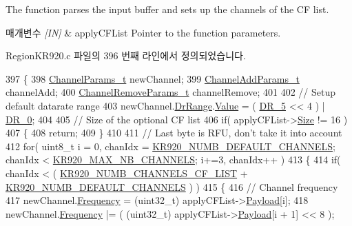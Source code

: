 The function parses the input buffer and sets up the channels of the CF list. 


\begin{DoxyParams}{매개변수}
{\em \mbox{[}\+I\+N\mbox{]}} & apply\+C\+F\+List Pointer to the function parameters. \\
\hline
\end{DoxyParams}


Region\+K\+R920.\+c 파일의 396 번째 라인에서 정의되었습니다.


\begin{DoxyCode}
397 \{
398     \mbox{\hyperlink{structs_channel_params}{ChannelParams\_t}} newChannel;
399     \mbox{\hyperlink{structs_channel_add_params}{ChannelAddParams\_t}} channelAdd;
400     \mbox{\hyperlink{structs_channel_remove_params}{ChannelRemoveParams\_t}} channelRemove;
401 
402     \textcolor{comment}{// Setup default datarate range}
403     newChannel.\mbox{\hyperlink{structs_channel_params_ad4d9b041ea740886a05fa8a1d06997a2}{DrRange}}.\mbox{\hyperlink{unionu_dr_range_ae1e3e8696366e3256e397bbdc4e34775}{Value}} = ( \mbox{\hyperlink{group___r_e_g_i_o_n_ga872e12c82020c02a7f70a1c6ed1375df}{DR\_5}} << 4 ) | \mbox{\hyperlink{group___r_e_g_i_o_n_ga6c4ef966b4f3d5eb7597b087f2b97095}{DR\_0}};
404 
405     \textcolor{comment}{// Size of the optional CF list}
406     \textcolor{keywordflow}{if}( applyCFList->\mbox{\hyperlink{structs_apply_c_f_list_params_ace31de7598e85e87624c4e7d8e5d112c}{Size}} != 16 )
407     \{
408         \textcolor{keywordflow}{return};
409     \}
410 
411     \textcolor{comment}{// Last byte is RFU, don't take it into account}
412     \textcolor{keywordflow}{for}( uint8\_t i = 0, chanIdx = \mbox{\hyperlink{group___r_e_g_i_o_n_k_r920_ga52b61aaab6dd3422f4c0e0551fd810fa}{KR920\_NUMB\_DEFAULT\_CHANNELS}}; chanIdx < 
      \mbox{\hyperlink{group___r_e_g_i_o_n_k_r920_ga28705c59a2c19a1de8b22d294fc6bebb}{KR920\_MAX\_NB\_CHANNELS}}; i+=3, chanIdx++ )
413     \{
414         \textcolor{keywordflow}{if}( chanIdx < ( \mbox{\hyperlink{group___r_e_g_i_o_n_k_r920_ga9184abc3c2682d4f7d9eee4d74bba21f}{KR920\_NUMB\_CHANNELS\_CF\_LIST}} + 
      \mbox{\hyperlink{group___r_e_g_i_o_n_k_r920_ga52b61aaab6dd3422f4c0e0551fd810fa}{KR920\_NUMB\_DEFAULT\_CHANNELS}} ) )
415         \{
416             \textcolor{comment}{// Channel frequency}
417             newChannel.\mbox{\hyperlink{structs_channel_params_ade3d190636488dad9a89b19446b7acf1}{Frequency}} = (uint32\_t) applyCFList->\mbox{\hyperlink{structs_apply_c_f_list_params_a3dfbfe76c8f3bd25765750487b815147}{Payload}}[i];
418             newChannel.\mbox{\hyperlink{structs_channel_params_ade3d190636488dad9a89b19446b7acf1}{Frequency}} |= ( (uint32\_t) applyCFList->\mbox{\hyperlink{structs_apply_c_f_list_params_a3dfbfe76c8f3bd25765750487b815147}{Payload}}[i + 1] << 8 );

\end{DoxyCode}

